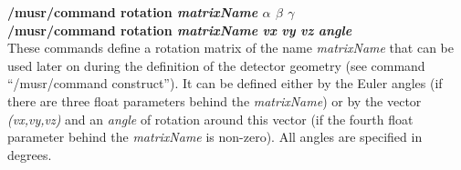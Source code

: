 \documentclass[twoside]{dis04}
\begin{document}
\begin{description}

\item{\bf /musr/command rotation \emph{matrixName} $\alpha$ $\beta$ $\gamma$} \\
	{\bf /musr/command rotation \emph{matrixName} \emph{vx} \emph{vy} \emph{vz} \emph{angle}}\\
	These commands define a rotation matrix of the name \emph{matrixName} that can be used later on
	during the definition of the detector geometry (see command ``/musr/command construct'').
	It can be defined either by the Euler angles (if there are three float parameters behind the
        \emph{matrixName}) or by the vector \emph{(vx,vy,vz)} and an \emph{angle} of rotation around this
	vector (if the fourth float parameter behind the \emph{matrixName} is non-zero).
	All angles are specified in degrees.


\end{description}
\end{document}
